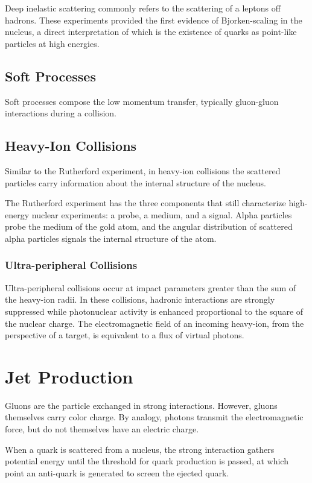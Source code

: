 Deep inelastic scattering commonly refers to the scattering of a leptons off hadrons. These experiments provided the first evidence of Bjorken-scaling in the nucleus, a direct interpretation of which is the existence of quarks as point-like particles at high energies.

\subsection{Soft Processes}

Soft processes compose the low momentum transfer, typically gluon-gluon interactions during a  collision.

\subsection{Heavy-Ion Collisions}

Similar to the Rutherford experiment, in heavy-ion collisions the scattered particles carry information about the internal structure of the nucleus. 

The Rutherford experiment has the three components that still characterize high-energy nuclear experiments: a probe, a medium, and a signal. Alpha particles probe the medium of the gold atom, and the angular distribution of scattered alpha particles signals the internal structure of the atom. 

\subsubsection{Ultra-peripheral Collisions}

Ultra-peripheral collisions occur at impact parameters greater than the sum of the heavy-ion radii. In these collisions, hadronic interactions are strongly suppressed while photonuclear activity is enhanced proportional to the square of the nuclear charge. The electromagnetic field of an incoming heavy-ion, from the perspective of a target, is equivalent to a flux of virtual photons. 

\section{Jet Production}

Gluons are the particle exchanged in strong interactions. However, gluons themselves carry color charge. By analogy, photons transmit the electromagnetic force, but do not themselves have an electric charge. 

When a quark is scattered from a nucleus, the strong interaction gathers potential energy until the threshold for quark production is passed, at which point an anti-quark is generated to screen the ejected quark.

